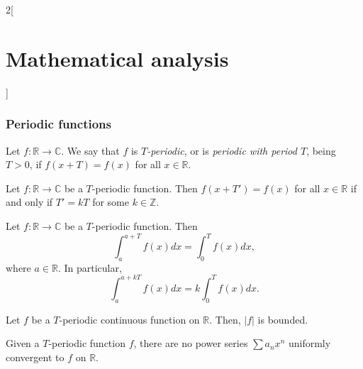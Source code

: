 \documentclass[class=article,crop=false]{standalone}
\begin{document}
\begin{multicols}{2}[\section{Mathematical analysis}]
\subsubsection*{Periodic functions}
\begin{definition}
Let $f:\mathbb{R}\rightarrow\mathbb{C}$. We say that $f$ is \textit{$T$-periodic}, or is \textit{periodic with period $T$}, being $T>0$, if $f(x+T)=f(x)$ for all $x\in\mathbb{R}$.
\end{definition}
\begin{lemma}
Let $f:\mathbb{R}\rightarrow\mathbb{C}$ be a $T$-periodic function. Then $f(x+T')=f(x)$ for all $x\in\mathbb{R}$ if and only if $T'=kT$ for some $k\in\mathbb{Z}$.
\end{lemma}
\begin{prop}
Let $f:\mathbb{R}\rightarrow\mathbb{C}$ be a $T$-periodic function. Then $$\int_a^{a+T}f(x)dx=\int_0^Tf(x)dx,$$ where $a\in\mathbb{R}$. In particular, $$\int_a^{a+kT}f(x)dx=k\int_0^Tf(x)dx.$$
\end{prop}
\begin{lemma}
Let $f$ be a $T$-periodic continuous function on $\mathbb{R}$. Then, $|f|$ is bounded.
\end{lemma}
\begin{prop}
Given a $T$-periodic function $f$, there are no power series $\sum a_nx^n$ uniformly convergent to $f$ on $\mathbb{R}$.
\end{prop}

\end{multicols}
\end{document}

